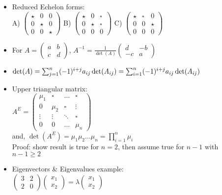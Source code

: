 \documentclass[10pt]{article}
\begin{document}
\begin{multicols}{2}
\begin{itemize}
    \item Reduced Echelon forms:\\
    A) $\begin{pmatrix}\star &0 &0\\ 0 &\star &0\\0 &0 &\star\end{pmatrix}$
    B) $\begin{pmatrix}\star &0 &\square\\ 0 &\star &\square\\0 &0 &0\end{pmatrix}$
    C) $\begin{pmatrix}\star &\square &0\\ 0 &0 &\star\\0 &0 &0\end{pmatrix}$
    \item For $A=\begin{pmatrix}a &b\\c& d\end{pmatrix}$, $A^{-1}=\frac{1}{\det(A)}\begin{pmatrix}d& -b\\-c &a\end{pmatrix}$
    \item $\det(A)=\sum^{n}_{j=1}(-1)^{i+j}a_{ij}\det(A_{ij})\\=\sum^{n}_{i=1}(-1)^{i+j}a_{ij}\det(A_{ij})$
    \item Upper triangular matrix:\\
    $A^{E}=\left(\begin{array}{cccc}
         \mu_{1} &\square &\hdots &\square  \\
         0 &\mu_{2} &\square &\vdots \\
         \vdots &\vdots &\ddots &\square\\
         0 &0 &\hdots &\mu_{n}
    \end{array}\right)$\\
    and, $\det(A^{E})=\mu_{1}\mu_{2}\dots\mu_{n}=\prod^{n}_{i=1}\mu_{i}$\\
    Proof: show result is true for $n=2$, then assume true for $n-1$ with $n-1\geq2$
    \item Eigenvectors \& Eigenvalues example:\\
    $\begin{pmatrix}3 &2\\2 &0\end{pmatrix}\begin{pmatrix}x_{1}\\x_{2}\end{pmatrix}=\lambda\begin{pmatrix}x_{1}\\x_{2}\end{pmatrix}$\\

\end{itemize}
\end{multicols}
\end{document}
